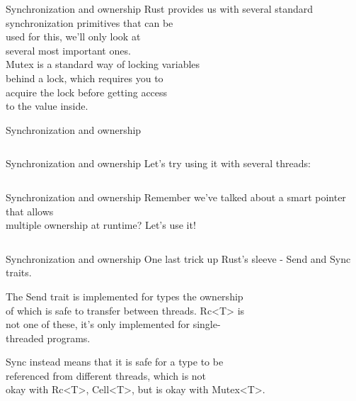 \documentclass[usenames,dvipsnames,10pt,aspectratio=169]{beamer}
\begin{document}
\begin{frame}{Synchronization and ownership}
	\Large
	Rust provides us with several standard\\
	synchronization primitives that can be\\
	used for this, we'll only look at\\
	several most important ones.\\
	\vspace{0.3cm}
	\textcolor{ucuyellow}{Mutex} is a standard way of locking variables\\
	behind a lock, which requires you to\\
	acquire the lock before getting access\\
	to the value inside.
\end{frame}

\begin{frame}{Synchronization and ownership}
	
	\vspace{0.3cm}
	\inputminted[fontsize=\large]{rust}{code/mutex1.rs}
\end{frame}

\begin{frame}{Synchronization and ownership}
	Let's try using it with several threads:\\
	\inputminted[fontsize=\footnotesize]{rust}{code/mutex2.rs}
	\vspace{0.3cm}
\end{frame}

\begin{frame}{Synchronization and ownership}
	Remember we've talked about a smart pointer that allows\\
	multiple ownership at runtime? Let's use it!
	\inputminted[fontsize=\footnotesize]{rust}{code/mutex3.rs}
	\vspace{0.3cm}
\end{frame}

\begin{frame}{Synchronization and ownership}
	One last trick up Rust's sleeve - \textcolor{ucuyellow}{Send}
	and \textcolor{ucuyellow}{Sync} traits.\\
	
	\vspace{0.3cm}

	The \textcolor{ucuyellow}{Send} trait is implemented for types
	the ownership\\
	of which is safe to transfer between
	threads. \textcolor{ucuyellow}{Rc<T>} is\\
	not one of these, it's only implemented for single-\\
	threaded programs.

	\vspace{0.3cm}

	\textcolor{ucuyellow}{Sync} instead means that it
	is safe for a type to be\\
	referenced from different threads, which is not\\
	okay with \textcolor{ucuyellow}{Rc<T>}, 
	\textcolor{ucuyellow}{Cell<T>}, but
	is okay with \textcolor{ucuyellow}{Mutex<T>}.
\end{frame}
\end{document}
